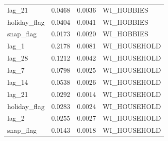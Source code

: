 \begin{table}
\begin{tabular}{lrrl}
lag_21 & 0.0468 & 0.0036 & WI_HOBBIES \\
holiday_flag & 0.0404 & 0.0041 & WI_HOBBIES \\
snap_flag & 0.0173 & 0.0020 & WI_HOBBIES \\
lag_1 & 0.2178 & 0.0081 & WI_HOUSEHOLD \\
lag_28 & 0.1212 & 0.0042 & WI_HOUSEHOLD \\
lag_7 & 0.0798 & 0.0025 & WI_HOUSEHOLD \\
lag_14 & 0.0538 & 0.0026 & WI_HOUSEHOLD \\
lag_21 & 0.0292 & 0.0014 & WI_HOUSEHOLD \\
holiday_flag & 0.0283 & 0.0024 & WI_HOUSEHOLD \\
lag_2 & 0.0255 & 0.0027 & WI_HOUSEHOLD \\
snap_flag & 0.0143 & 0.0018 & WI_HOUSEHOLD \\
\bottomrule
\end{tabular}
\end{table}
